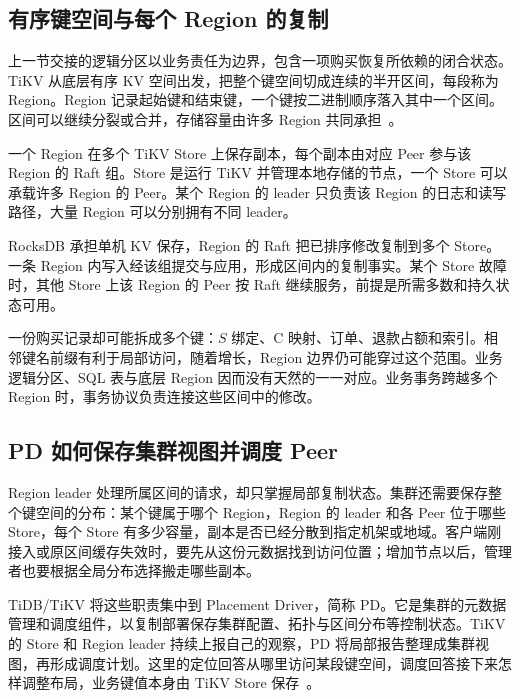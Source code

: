 \label{sec:ch17-tikv-regions}
\subsection*{有序键空间与每个 Region 的复制}

上一节交接的逻辑分区以业务责任为边界，包含一项购买恢复所依赖的闭合状态。TiKV 从底层有序 KV 空间出发，把整个键空间切成连续的半开区间，每段称为 Region。Region 记录起始键和结束键，一个键按二进制顺序落入其中一个区间。区间可以继续分裂或合并，存储容量由许多 Region 共同承担~\cite{tikv-75-storage}。

一个 Region 在多个 TiKV Store 上保存副本，每个副本由对应 Peer 参与该 Region 的 Raft 组。Store 是运行 TiKV 并管理本地存储的节点，一个 Store 可以承载许多 Region 的 Peer。某个 Region 的 leader 只负责该 Region 的日志和读写路径，大量 Region 可以分别拥有不同 leader。


RocksDB 承担单机 KV 保存，Region 的 Raft 把已排序修改复制到多个 Store。一条 Region 内写入经该组提交与应用，形成区间内的复制事实。某个 Store 故障时，其他 Store 上该 Region 的 Peer 按 Raft 继续服务，前提是所需多数和持久状态可用。

一份购买记录却可能拆成多个键：$S$ 绑定、C 映射、订单、退款占额和索引。相邻键名前缀有利于局部访问，随着增长，Region 边界仍可能穿过这个范围。业务逻辑分区、SQL 表与底层 Region 因而没有天然的一一对应。业务事务跨越多个 Region 时，事务协议负责连接这些区间中的修改。

\subsection*{PD 如何保存集群视图并调度 Peer}

Region leader 处理所属区间的请求，却只掌握局部复制状态。集群还需要保存整个键空间的分布：某个键属于哪个 Region，Region 的 leader 和各 Peer 位于哪些 Store，每个 Store 有多少容量，副本是否已经分散到指定机架或地域。客户端刚接入或原区间缓存失效时，要先从这份元数据找到访问位置；增加节点以后，管理者也要根据全局分布选择搬走哪些副本。

TiDB/TiKV 将这些职责集中到 Placement Driver，简称 PD。它是集群的元数据管理和调度组件，以复制部署保存集群配置、拓扑与区间分布等控制状态。TiKV 的 Store 和 Region leader 持续上报自己的观察，PD 将局部报告整理成集群视图，再形成调度计划。这里的定位回答从哪里访问某段键空间，调度回答接下来怎样调整布局，业务键值本身由 TiKV Store 保存~\cite{tidb-75-pd}。


